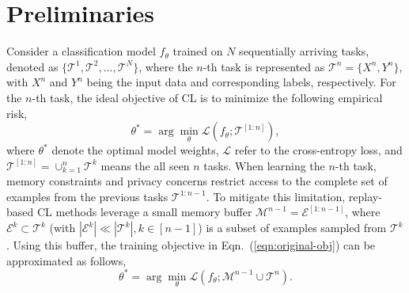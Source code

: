 \documentclass[table, xcdraw]{article}
\theoremstyle{plain}
\theoremstyle{definition}
\theoremstyle{remark}
\begin{document}
\section{Preliminaries}
Consider a classification model $f_\theta$ trained on $N$ sequentially arriving tasks, denoted as $\{\mathcal{T}^1,\mathcal{T}^2,...,\mathcal{T}^N\}$, where the $n$-th task is represented as $\mathcal{T}^n=\{X^n,Y^n\}$, with $X^n$ and $Y^n$ being the input data and corresponding labels, respectively. For the $n$-th task, the ideal objective of CL is to minimize the following empirical risk,
\begin{equation}
    \theta^*  = \arg\min_{\theta}  \mathcal{L}(f_{\theta};\mathcal T^{[1:n]}),
    \label{eqn:original-obj}
\end{equation}
where $\theta^*$ denote the optimal model weights, $\mathcal{L}$ refer to the cross-entropy loss, and $\mathcal T^{[1:n]}=\cup_{k=1}^n \mathcal{T}^k$ means the all seen $n$ tasks.
When learning the $n$-th task, memory constraints and privacy concerns restrict access to the complete set of examples from the previous tasks $\mathcal{T}^{1:n-1}$. To mitigate this limitation, replay-based CL methods leverage a small memory buffer $\mathcal M^{n-1}=\mathcal E^{[1:n-1]}$, where $\mathcal E^k\subset\mathcal T^k$ (with $|\mathcal E^k|\ll|\mathcal T^k|, k\in[n-1]$) is a subset of examples sampled from $\mathcal{T}^{k}$. Using this buffer, the training objective in Eqn.~(\ref{eqn:original-obj}) can be approximated as follows,
\begin{equation}
    \theta^*  = \arg\min_\theta  \mathcal{L}(f_{\theta};\mathcal M^{n-1} \cup \mathcal{T}^n).
    \label{core-set}
\end{equation}
\end{document}
